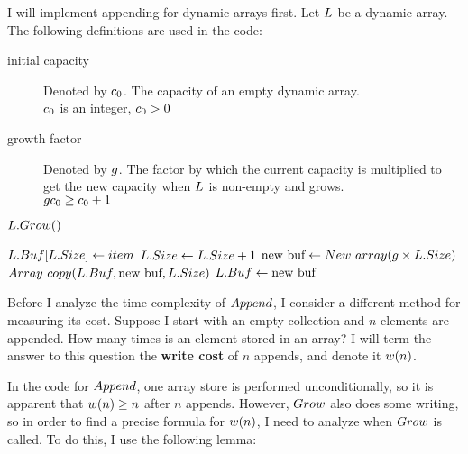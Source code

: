 \HdrDynArrayImpl

I will implement appending for dynamic arrays first. Let $L$ be a dynamic array. The following definitions are used in the code:

\begin{description}
	\item[initial capacity] Denoted by $c_0$. The capacity of an empty dynamic array.\\
	{\HdrAssumptions} $c_0$ is an integer, $c_0 > 0$
	\item[growth factor] Denoted by $g$. The factor by which the current capacity is multiplied to get the new capacity when $L$ is non-empty and grows.\\
	{\HdrAssumptions} $gc_0 \geq c_0 + 1$
\end{description}

\begin{algorithm}
	\begin{algorithmic}[1]
				\State $L.Grow()$
			\EndIf
			
			\State $L.Buf[L.Size] \gets item$
			\State $L.Size \gets L.Size + 1$
		\EndProcedure
		\Statex
			\State $\text{new buf} \gets New\ array(g \times L.Size)$
			\State $Array\ copy(L.Buf, \text{new buf}, L.Size)$
			\State $L.Buf \gets \text{new buf}$
		\EndProcedure
	\end{algorithmic}
\end{algorithm}

\HdrTimeComplex

Before I analyze the time complexity of $Append$, I consider a different method for measuring its cost. Suppose I start with an empty collection and $n$ elements are appended. How many times is an element stored in an array? I will term the answer to this question the \textbf{write cost} of $n$ appends, and denote it $w(n)$.

In the code for $Append$, one array store is performed unconditionally, so it is apparent that $w(n) \geq n$ after $n$ appends. However, $Grow$ also does some writing, so in order to find a precise formula for $w(n)$, I need to analyze when $Grow$ is called. To do this, I use the following lemma:

